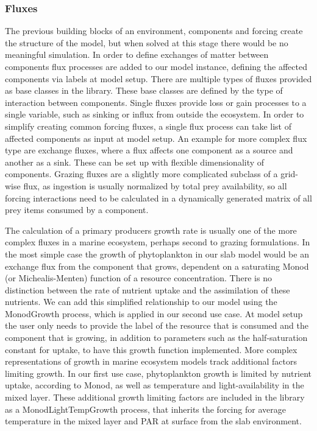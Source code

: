 \documentclass[template.tex]{subfiles}
\begin{document}
\subsubsection{Fluxes}
The previous building blocks of an environment, components and forcing create the structure of the model, but when solved at this stage there would be no meaningful simulation. In order to define exchanges of matter between components flux processes are added to our model instance, defining the affected components via labels at model setup.
There are multiple types of fluxes provided as base classes in the library. These base classes are defined by the type of interaction between components. Single fluxes provide loss or gain processes to a single variable, such as sinking or influx from outside the ecosystem. In order to simplify creating common forcing fluxes, a single flux process can take list of affected components as input at model setup. An example for more complex flux type are exchange fluxes, where a flux affects one component as a source and another as a sink. These can be set up with flexible dimensionality of components. Grazing fluxes are a slightly more complicated subclass of a grid-wise flux, as ingestion is usually normalized by total prey availability, so all forcing interactions need to be calculated in a dynamically generated matrix of all prey items consumed by a component.

The calculation of a primary producers growth rate is usually one of the more complex fluxes in a marine ecosystem, perhaps second to grazing formulations. In the most simple case the growth of phytoplankton in our slab model would be an exchange flux from the component that grows, dependent on a saturating Monod (or Michealis-Menten) function of a resource concentration. There is no distinction between the rate of nutrient uptake and the assimilation of these nutrients. We can add this simplified relationship to our model using the MonodGrowth process, which is applied in our second use case. At model setup the user only needs to provide the label of the resource that is consumed and the component that is growing, in addition to parameters such as the half-saturation constant for uptake, to have this growth function implemented.
More complex representations of growth in marine ecosystem models track additional factors limiting growth. In our first use case, phytoplankton growth is limited by nutrient uptake, according to Monod, as well as temperature and light-availability in the mixed layer. These additional growth limiting factors are included in the library as a MonodLightTempGrowth process, that inherits the forcing for average temperature in the mixed layer and PAR at surface from the slab environment.
\end{document}
